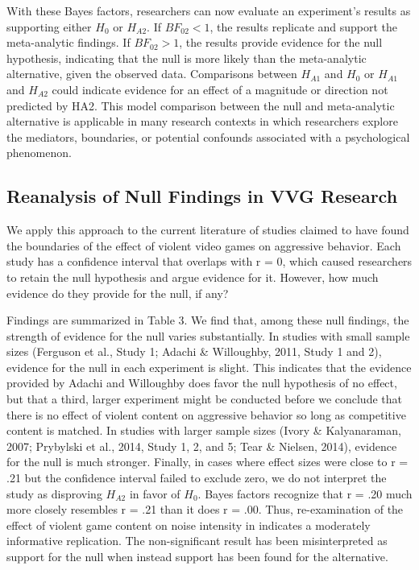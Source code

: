 \documentclass[fignum,nobf,man]{apa}
\begin{document}
With these Bayes factors, researchers can now evaluate an experiment's results as supporting either $H_0$ or $H_{A2}$. If $BF_{02} < 1$, the results replicate and support the meta-analytic findings. If $BF_{02} > 1$, the results provide evidence for the null hypothesis, indicating that the null is more likely than the meta-analytic alternative, given the observed data.  Comparisons between $H_{A1}$ and $H_0$ or $H_{A1}$ and $H_{A2}$ could indicate evidence for an effect of a magnitude or direction not predicted by HA2. This model comparison between the null and meta-analytic alternative is applicable in many research contexts in which researchers explore the mediators, boundaries, or potential confounds associated with a psychological phenomenon.

\subsection{Reanalysis of Null Findings in VVG Research}
We apply this approach to the current literature of studies claimed to have found the boundaries of the effect of violent video games on aggressive behavior. Each study has a confidence interval that overlaps with r = 0, which caused researchers to retain the null hypothesis and argue evidence for it. However, how much evidence do they provide for the null, if any?

Findings are summarized in Table 3. We find that, among these null findings, the strength of evidence for the null varies substantially. In studies with small sample sizes (Ferguson et al., Study 1; Adachi \& Willoughby, 2011, Study 1 and 2), %
evidence for the null in each experiment is slight. This indicates that the evidence provided by Adachi and Willoughby does favor the null hypothesis of no effect, but that a third, larger experiment might be conducted before we conclude that there is no effect of violent content on aggressive behavior so long as competitive content is matched. In studies with larger sample sizes (Ivory \& Kalyanaraman, 2007; Prybylski et al., 2014, Study 1, 2, and 5; Tear \& Nielsen, 2014), %
evidence for the null is much stronger.	Finally, in cases where effect sizes were close to r = .21 but the confidence interval failed to exclude zero, we do not interpret the study as disproving $H_{A2}$ in favor of $H_0$. Bayes factors recognize that r = .20 much more closely resembles r = .21 than it does r = .00. Thus, re-examination of the effect of violent game content on noise intensity in \citet{Elson:etal:2014} indicates a moderately informative replication. The non-significant result has been misinterpreted as support for the null when instead support has been found for the alternative.
\end{document}
